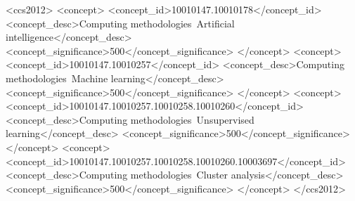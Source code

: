 \documentclass[sigconf]{acmart}
\newcommand{\1}{\boldsymbol{1}}
\newcommand{\0}{\boldsymbol{0}}
\begin{document}

\begin{CCSXML}
<ccs2012>
<concept>
<concept_id>10010147.10010178</concept_id>
<concept_desc>Computing methodologies~Artificial intelligence</concept_desc>
<concept_significance>500</concept_significance>
</concept>
<concept>
<concept_id>10010147.10010257</concept_id>
<concept_desc>Computing methodologies~Machine learning</concept_desc>
<concept_significance>500</concept_significance>
</concept>
<concept>
<concept_id>10010147.10010257.10010258.10010260</concept_id>
<concept_desc>Computing methodologies~Unsupervised learning</concept_desc>
<concept_significance>500</concept_significance>
</concept>
<concept>
<concept_id>10010147.10010257.10010258.10010260.10003697</concept_id>
<concept_desc>Computing methodologies~Cluster analysis</concept_desc>
<concept_significance>500</concept_significance>
</concept>
</ccs2012>
\end{CCSXML}



\maketitle
\end{document}

